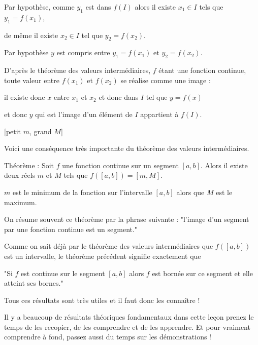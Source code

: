 \change

Par hypothèse, comme $y_1$ est dans $f(I)$ alors il existe $x_1\in I$ tels que $y_1 =f(x_1)$, 

de même il existe $x_2 \in I$ tel que $y_2 =f(x_2)$.

\change

Par hypothèse  $y$ est compris entre $y_1=f(x_1)$ et $y_2=f(x_2)$. 

\change

D'après le théorème des valeurs intermédiaires, 
$f$ étant une fonction continue, 
toute valeur entre $f(x_1)$ et $f(x_2)$ se réalise comme une image :

il existe donc $x$ entre $x_1$ et $x_2$ et donc dans $I$ tel que $y=f(x)$

\change


et donc $y$ qui est l'image d'un élément de $I$ appartient à $f(I)$.



\diapo

[petit $m$, grand $M$]

Voici une conséquence très importante du théorème des valeurs intermédiaires.

Théorème : Soit $f$ une fonction continue sur un segment $[a,b]$. 
Alors il existe deux réels $m$ et $M$ tels que $f([a,b])=[m,M]$. 

\change

$m$ est le minimum de la fonction sur l'intervalle $[a,b]$ alors que $M$ est le maximum.

\change

On résume souvent ce théorème par la phrase suivante  : 
"l'image d'un segment par une fonction continue est un segment."


\change

Comme on sait déjà par le théorème des valeurs intermédiaires que 
$f([a,b])$ est un intervalle, le théorème précédent signifie exactement que 

"Si $f$ est continue sur le segment $[a,b]$ alors $f$ est bornée 
sur ce segment et elle atteint ses bornes."


Tous ces résultats sont très utiles et il faut donc les connaître !


\diapo


Il y a beaucoup de résultats théoriques fondamentaux dans cette leçon prenez le temps de les recopier, 
de les comprendre et de les apprendre. Et pour vraiment comprendre à fond, 
passez aussi du temps sur les démonstrations !




